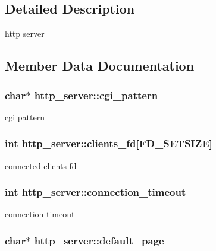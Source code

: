 \subsection{Detailed Description}
http server 

\subsection{Member Data Documentation}
\hypertarget{structhttp__server_ad1ae54cf82b2a45d41e0fd940cd55bd0}{
\subsubsection[{cgi\_\-pattern}]{\setlength{\rightskip}{0pt plus 5cm}char$\ast$ {\bf http\_\-server::cgi\_\-pattern}}}
\label{structhttp__server_ad1ae54cf82b2a45d41e0fd940cd55bd0}
cgi pattern \hypertarget{structhttp__server_ab5ad96c5f1ef00fc3ee2fbf9c344e536}{
\subsubsection[{clients\_\-fd}]{\setlength{\rightskip}{0pt plus 5cm}int {\bf http\_\-server::clients\_\-fd}\mbox{[}FD\_\-SETSIZE\mbox{]}}}
\label{structhttp__server_ab5ad96c5f1ef00fc3ee2fbf9c344e536}
connected clients fd \hypertarget{structhttp__server_a2adef7772851f50f0058fa9cfc8f240d}{
\subsubsection[{connection\_\-timeout}]{\setlength{\rightskip}{0pt plus 5cm}int {\bf http\_\-server::connection\_\-timeout}}}
\label{structhttp__server_a2adef7772851f50f0058fa9cfc8f240d}
connection timeout \hypertarget{structhttp__server_ab91aa6ac27175544a71f89764137ace9}{
\subsubsection[{default\_\-page}]{\setlength{\rightskip}{0pt plus 5cm}char$\ast$ {\bf http\_\-server::default\_\-page}}}
